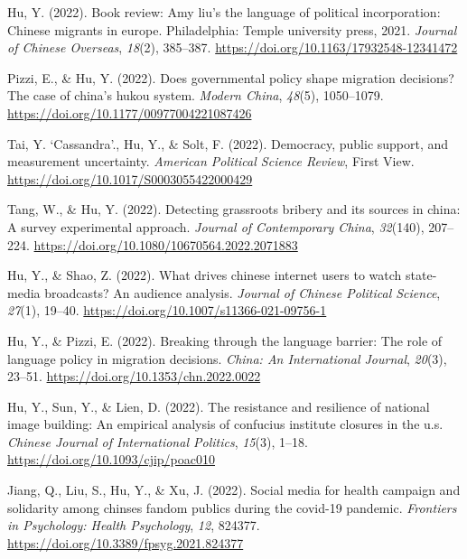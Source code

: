 \documentclass[
  12pt,
]
{article}
\newlength{\cslhangindent}
\newlength{\cslentryspacingunit} %
\newenvironment{CSLReferences}[2] %
 {%
  \setlength{\parindent}{0pt}
  \ifodd #1
  \let\oldpar\par
  \def\par{\hangindent=\cslhangindent\oldpar}
  \fi
  \setlength{\parskip}{#2\cslentryspacingunit}
 }%
 {}
\begin{document}
\hypertarget{refs-peer}{}
\begin{CSLReferences}{1}{0}
\leavevmode{}%
Hu, Y. (2022). Book review: Amy liu's the language of political
incorporation: Chinese migrants in europe. {Philadelphia}: Temple
university press, 2021. \emph{Journal of Chinese Overseas},
\emph{18}(2), 385--387. \url{https://doi.org/10.1163/17932548-12341472}

\leavevmode{}%
Pizzi, E., \& Hu, Y. (2022). Does governmental policy shape migration
decisions? {The} case of china's hukou system. \emph{Modern China},
\emph{48}(5), 1050--1079.
\url{https://doi.org/10.1177/00977004221087426}

\leavevmode{}%
Tai, Y. `Cassandra'., Hu, Y., \& Solt, F. (2022). Democracy, public
support, and measurement uncertainty. \emph{American Political Science
Review}, First View. \url{https://doi.org/10.1017/S0003055422000429}

\leavevmode{}%
Tang, W., \& Hu, Y. (2022). Detecting grassroots bribery and its sources
in china: A survey experimental approach. \emph{Journal of Contemporary
China}, \emph{32}(140), 207--224.
\url{https://doi.org/10.1080/10670564.2022.2071883}

\leavevmode{}%
Hu, Y., \& Shao, Z. (2022). What drives chinese internet users to watch
state-media broadcasts? {An} audience analysis. \emph{Journal of Chinese
Political Science}, \emph{27}(1), 19--40.
\url{https://doi.org/10.1007/s11366-021-09756-1}

\leavevmode{}%
Hu, Y., \& Pizzi, E. (2022). Breaking through the language barrier: The
role of language policy in migration decisions. \emph{China: An
International Journal}, \emph{20}(3), 23--51.
\url{https://doi.org/10.1353/chn.2022.0022}

\leavevmode{}%
Hu, Y., Sun, Y., \& Lien, D. (2022). The resistance and resilience of
national image building: An empirical analysis of confucius institute
closures in the u.s. \emph{Chinese Journal of International Politics},
\emph{15}(3), 1--18. \url{https://doi.org/10.1093/cjip/poac010}

\leavevmode{}%
Jiang, Q., Liu, S., Hu, Y., \& Xu, J. (2022). Social media for health
campaign and solidarity among chinses fandom publics during the covid-19
pandemic. \emph{Frontiers in Psychology: Health Psychology}, \emph{12},
824377. \url{https://doi.org/10.3389/fpsyg.2021.824377}


\end{CSLReferences}
\end{document}
